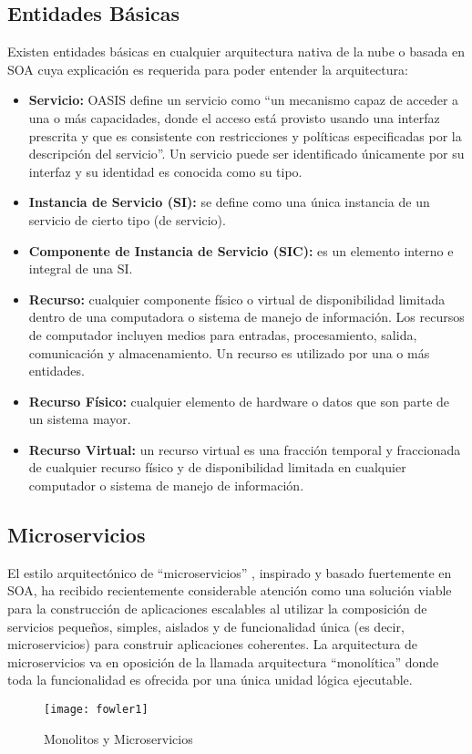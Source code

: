         \subsection{Entidades Básicas}
        Existen entidades básicas en cualquier arquitectura nativa de la nube o basada en SOA cuya explicación es requerida para poder entender la arquitectura:
        \begin{itemize}
            \item \textbf{Servicio:} OASIS define un servicio como  “un mecanismo capaz de acceder a una o más capacidades, donde el acceso está provisto usando una interfaz prescrita y que es consistente con restricciones y políticas especificadas por la descripción del servicio”. Un servicio puede ser identificado únicamente por su interfaz y su identidad es conocida como su tipo. 
            \item \textbf{Instancia de Servicio (SI):} se define como una única instancia de un servicio de cierto tipo (de servicio).
            \item \textbf{Componente de Instancia de Servicio (SIC):} es un elemento interno e integral de una SI.
            \item \textbf{Recurso:} cualquier componente físico o virtual de disponibilidad limitada dentro de una computadora o sistema de manejo de información. Los recursos de computador incluyen medios para entradas, procesamiento, salida, comunicación y almacenamiento. Un recurso es utilizado por una o más entidades.
            \item \textbf{Recurso Físico:} cualquier elemento de hardware o datos que son parte de un sistema mayor.
            \item \textbf{Recurso Virtual: }un recurso virtual es una fracción temporal y fraccionada de cualquier recurso físico y de disponibilidad limitada en cualquier computador o sistema de manejo de información.
        \end{itemize}
     
        \subsection{Microservicios}
        El estilo arquitectónico de “microservicios” \cite{Lewis2016-az}, inspirado y basado fuertemente en SOA, ha recibido recientemente considerable atención como una solución viable para la construcción de aplicaciones escalables  al utilizar la composición de servicios pequeños, simples, aislados y de funcionalidad única (es decir, microservicios) para construir aplicaciones coherentes. La arquitectura de microservicios va en oposición de la llamada arquitectura “monolítica” donde toda la funcionalidad es ofrecida por una única unidad lógica ejecutable.
        \begin{figure}[ht]
            \centering
            \texttt{[image: fowler1]}
            \caption{Monolitos y Microservicios \protect\cite{Lewis2016-az}}
            \label{fig:fowler1}
        \end{figure}
    

